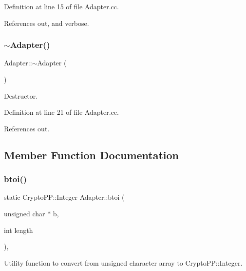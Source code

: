 Definition at line 15 of file Adapter.\+cc.



References out, and verbose.

\mbox{\label{classAdapter_a08a07acff57eb40aba27455de23ed13c}} 
\subsubsection{\texorpdfstring{$\sim$\+Adapter()}{~Adapter()}}
{\footnotesize\ttfamily Adapter\+::$\sim$\+Adapter (\begin{DoxyParamCaption}{ }\end{DoxyParamCaption})\hspace{0.3cm}{\ttfamily [virtual]}}



Destructor. 



Definition at line 21 of file Adapter.\+cc.



References out.



\subsection{Member Function Documentation}
\mbox{\label{classAdapter_ac816b07d03c876f535286cd757a0995b}} 
\subsubsection{\texorpdfstring{btoi()}{btoi()}\hspace{0.1cm}{\footnotesize\ttfamily [1/2]}}
{\footnotesize\ttfamily static Crypto\+P\+P\+::\+Integer Adapter\+::btoi (\begin{DoxyParamCaption}\item[{unsigned char $\ast$}]{b,  }\item[{int}]{length }\end{DoxyParamCaption})\hspace{0.3cm}{\ttfamily [inline]}, {\ttfamily [static]}}



Utility function to convert from unsigned character array to Crypto\+P\+P\+::\+Integer. 

